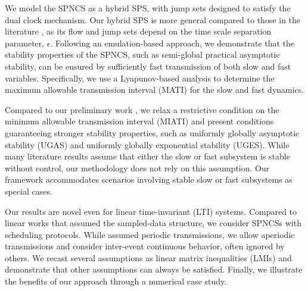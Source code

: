 We model the SPNCS as a hybrid SPS, with jump sets designed to satisfy the dual clock mechanism. Our hybrid SPS is more general compared to those in the literature \cite{sanfelice2011singular,wang2012analysis,6161309}, as its flow and jump sets depend on the time scale separation parameter, $\epsilon$. Following an emulation-based approach, we demonstrate that the stability properties of the SPNCS, such as semi-global practical asymptotic stability, can be ensured by sufficiently fast transmission of both slow and fast variables. Specifically, we use a Lyapunov-based analysis to determine the maximum allowable transmission interval (MATI) for the slow and fast dynamics.

Compared to our preliminary work \cite{Single_channel_NCS_CDC}, we relax a restrictive condition on the minimum allowable transmission interval (MIATI) and present conditions guaranteeing stronger stability properties, such as uniformly globally asymptotic stability (UGAS) and uniformly globally exponential stability (UGES). While many literature results \cite{Romain_ETC} assume that either the slow or fast subsystem is stable without control, our methodology does not rely on this assumption. Our framework accommodates scenarios involving stable slow or fast subsystems as special cases.

Our results are novel even for linear time-invariant (LTI) systems. Compared to linear works \cite{song2019dynamic,lei2022event} that assumed the sampled-data structure, we consider SPNCSs with scheduling protocols. While \cite{wang2021observer,song2019dynamic,cheng2021ultimate,lei2022event} assumed periodic transmissions, we allow aperiodic transmissions and consider inter-event continuous behavior, often ignored by others. We recast several assumptions as linear matrix inequalities (LMIs) and demonstrate that other assumptions can always be satisfied. Finally, we illustrate the benefits of our approach through a numerical case study.






